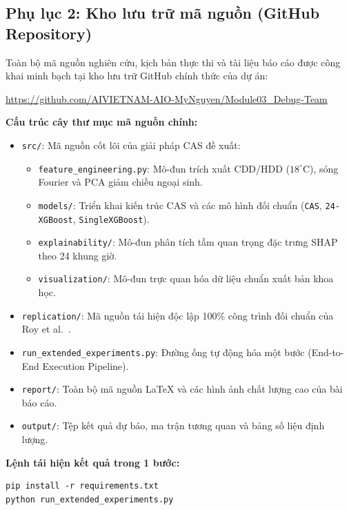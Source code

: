 \subsection*{Phụ lục 2: Kho lưu trữ mã nguồn (GitHub Repository)}
\label{subsec:appendix_github}

Toàn bộ mã nguồn nghiên cứu, kịch bản thực thi và tài liệu báo cáo được công khai minh bạch tại kho lưu trữ GitHub chính thức của dự án:
\begin{center}
    \url{https://github.com/AIVIETNAM-AIO-MyNguyen/Module03_Debug-Team}
\end{center}

\textbf{Cấu trúc cây thư mục mã nguồn chính:}
\begin{itemize}
    \item \texttt{src/}: Mã nguồn cốt lõi của giải pháp CAS đề xuất:
    \begin{itemize}
        \item \texttt{feature\_engineering.py}: Mô-đun trích xuất CDD/HDD ($18^\circ\text{C}$), sóng Fourier và PCA giảm chiều ngoại sinh.
        \item \texttt{models/}: Triển khai kiến trúc CAS và các mô hình đối chuẩn (\texttt{CAS}, \texttt{24-XGBoost}, \texttt{SingleXGBoost}).
        \item \texttt{explainability/}: Mô-đun phân tích tầm quan trọng đặc trưng SHAP theo 24 khung giờ.
        \item \texttt{visualization/}: Mô-đun trực quan hóa dữ liệu chuẩn xuất bản khoa học.
    \end{itemize}
    \item \texttt{replication/}: Mã nguồn tái hiện độc lập 100\% công trình đối chuẩn của Roy et al.~\cite{roy2025hourly}.
    \item \texttt{run\_extended\_experiments.py}: Đường ống tự động hóa một bước (End-to-End Execution Pipeline).
    \item \texttt{report/}: Toàn bộ mã nguồn \LaTeX{} và các hình ảnh chất lượng cao của bài báo cáo.
    \item \texttt{output/}: Tệp kết quả dự báo, ma trận tương quan và bảng số liệu định lượng.
\end{itemize}

\textbf{Lệnh tái hiện kết quả trong 1 bước:}
\begin{verbatim}
pip install -r requirements.txt
python run_extended_experiments.py
\end{verbatim}

